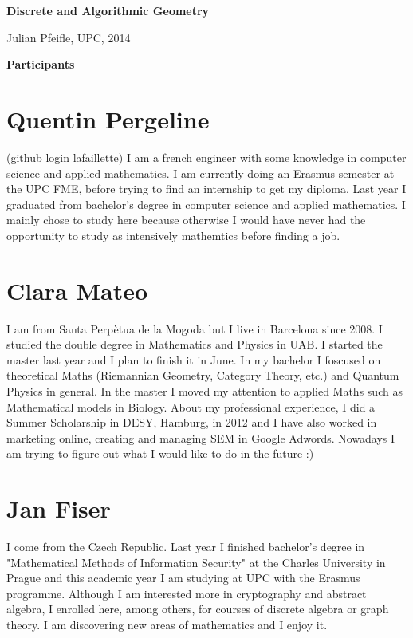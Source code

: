 \documentclass[11pt]{amsart}
\begin{document}
\begin{center}
\textbf{\sffamily
   Discrete and Algorithmic Geometry }

\medskip
   Julian Pfeifle,
   UPC, 2014 \mbox{}
\end{center}

\bigskip

\begin{center}
  \textbf{\sffamily Participants}
\end{center}

\medskip

\section*{Quentin Pergeline}
(github login lafaillette) I am a french engineer with some knowledge in computer science and applied mathematics.
I am currently doing an Erasmus semester at the UPC FME, before trying to find an internship to get my diploma.
Last year I graduated from bachelor's degree in computer science and applied mathematics. 
I mainly chose to study here because otherwise I would have never had the opportunity to study as intensively mathemtics before finding a job.


\section*{Clara Mateo}
I am from Santa Perp\`etua de la Mogoda but I live in Barcelona since 2008. I studied the double degree in Mathematics and Physics in UAB. I started the master last year and I plan to finish it in June. 
In my bachelor I foscused on theoretical Maths (Riemannian Geometry, Category Theory, etc.) and Quantum Physics in general. In the master I moved my attention to applied Maths such as Mathematical models in Biology. 
About my professional experience, I did a Summer Scholarship in DESY, Hamburg, in 2012 and I have also worked in marketing online, creating and managing SEM in Google Adwords.  
Nowadays I am trying to figure out what I would like to do in the future :)
\medskip


\section*{Jan Fiser}
I come from the Czech Republic. Last year I finished bachelor's degree in "Mathematical Methods of Information Security" at the Charles University in Prague and this academic year I am studying at UPC with the Erasmus programme.
Although I am interested more in cryptography and abstract algebra, I enrolled here, among others, for courses of discrete algebra or graph theory. I am discovering new areas of mathematics and I enjoy it.
\medskip
\end{document}
